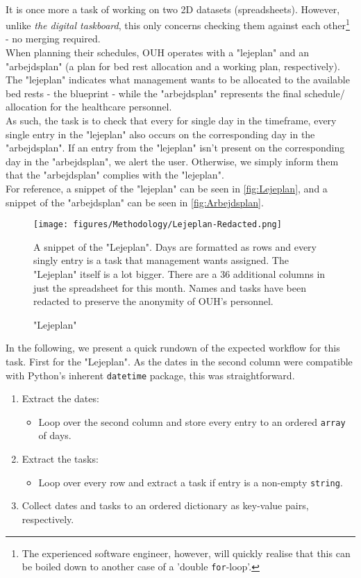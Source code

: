 \\
It is once more a task of working on two 2D datasets (spreadsheets). However, unlike \emph{the digital taskboard}, this only concerns checking them against each other\footnote{The experienced software engineer, however, will quickly realise that this can be boiled down to another case of a 'double \texttt{for}-loop'.} - no merging required.
\\
When planning their schedules, OUH operates with a "lejeplan" and an "arbejdsplan" (a plan for bed rest allocation and a working plan, respectively). The "lejeplan" indicates what management wants to be allocated to the available bed rests - the blueprint - while the "arbejdsplan" represents the final schedule/ allocation for the healthcare personnel. 
\\
As such, the task is to check that every for single day in the timeframe, every single entry in the "lejeplan" also occurs on the corresponding day in the "arbejdsplan". If an entry from the "lejeplan" isn't present on the corresponding day in the "arbejdsplan", we alert the user. Otherwise, we simply inform them that the "arbejdsplan" complies with the "lejeplan".
\\
For reference, a snippet of the "lejeplan" can be seen in \autoref{fig:Lejeplan}, and a snippet of the "arbejdsplan" can be seen in \autoref{fig:Arbejdsplan}.
\begin{figure}[H]
    \centering
    \texttt{[image: figures/Methodology/Lejeplan-Redacted.png]}
    \caption{"Lejeplan"}
    \small
    \raggedright 
    A snippet of the "Lejeplan". Days are formatted as rows and every singly entry is a task that management wants assigned. The "Lejeplan" itself is a lot bigger. There are a \(36\) additional columns in just the spreadsheet for this month. Names and tasks have been redacted to preserve the anonymity of OUH's personnel.
    \label{fig:Lejeplan}
\end{figure}

In the following, we present a quick rundown of the expected workflow for this task. First for the "Lejeplan". As the dates in the second column were compatible with Python's inherent \texttt{datetime} package, this was straightforward.
\begin{enumerate}
	\item Extract the dates:
		\begin{itemize}
			\item Loop over the second column and store every entry to an ordered \texttt{array} of days.	
		\end{itemize}
	\item Extract the tasks:
		\begin{itemize}
			\item Loop over every row and extract a task if entry is a non-empty \texttt{string}.	
		\end{itemize}
	\item Collect dates and tasks to an ordered \gls{dictionary} as key-value pairs, respectively.
\end{enumerate}

